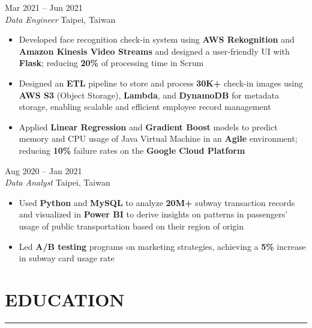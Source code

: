 \documentclass[11pt,letterpaper]{article}
\begin{document}
\vspace{0.35\baselineskip}  %
 \hfill Mar 2021 -- Jun 2021\\[-1pt]
\textit{Data Engineer} \hfill Taipei, Taiwan
\begin{itemize}[leftmargin=1.5em, rightmargin=0pt, itemsep=-1pt, topsep=0pt, parsep=0pt]
  \item \justifying Developed face recognition check-in system using \textbf{AWS Rekognition} and \textbf{Amazon Kinesis Video Streams} and designed a user-friendly UI with \textbf{Flask}; reducing \textbf{20\%} of processing time in Scrum
  \item \justifying Designed an \textbf{ETL} pipeline to store and process \textbf{30K+} check-in images using \textbf{AWS S3} (Object Storage), \textbf{Lambda}, and \textbf{DynamoDB} for metadata storage, enabling scalable and efficient employee record management
  \item \justifying Applied \textbf{Linear Regression} and \textbf{Gradient Boost} models to predict memory and CPU usage of Java Virtual Machine in an \textbf{Agile} environment; reducing \textbf{10\%} failure rates on the \textbf{Google Cloud Platform}
\end{itemize}

\vspace{0.35\baselineskip}  %
 \hfill Aug 2020 -- Jan 2021\\[-1pt]
\textit{Data Analyst} \hfill Taipei, Taiwan
\begin{itemize}[leftmargin=1.5em, rightmargin=0pt, itemsep=-1pt, topsep=0pt, parsep=0pt]
  \item \justifying Used \textbf{Python} and \textbf{MySQL} to analyze \textbf{20M+} subway transaction records and visualized in \textbf{Power BI} to derive insights on patterns in passengers' usage of public transportation based on their region of origin
  \item \justifying Led \textbf{A/B testing} programs on marketing strategies, achieving a \textbf{5\%} increase in subway card usage rate
\end{itemize}

\vspace{0.5\baselineskip}  %
\section*{EDUCATION}
\vspace{-8pt}\noindent\rule{\textwidth}{0.8pt}
\end{document}
